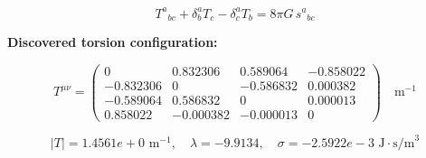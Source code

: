 
\begin{equation}
  T^a{}_{bc} + \delta^a_b T_c - \delta^a_c T_b = 8\pi G \, s^a{}_{bc}
\end{equation}

\textbf{Discovered torsion configuration:}

\begin{equation}
  T^{\mu\nu} = \begin{pmatrix}
    0 & 0.832306 & 0.589064 & -0.858022 \\
    -0.832306 & 0 & -0.586832 & 0.000382 \\
    -0.589064 & 0.586832 & 0 & 0.000013 \\
    0.858022 & -0.000382 & -0.000013 & 0
  \end{pmatrix} \quad \text{m}^{-1}
\end{equation}

\begin{equation}
  |T| = 1.4561e+0 \text{ m}^{-1}, \quad
  \lambda = -9.9134, \quad
  \sigma = -2.5922e-3 \text{ J}\cdot\text{s/m}^3
\end{equation}